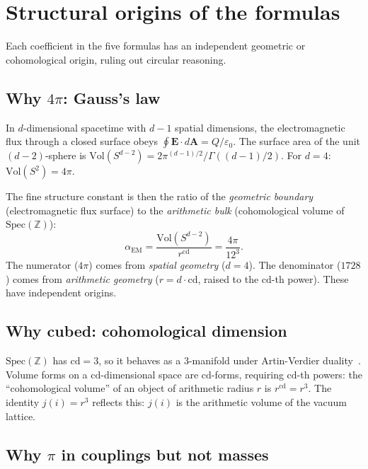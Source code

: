 \documentclass[aps,prl,twocolumn,superscriptaddress,nofootinbib]{revtex4-2}
\newcommand{\Spec}{\mathrm{Spec}}
\newcommand{\cd}{\mathrm{cd}}
\newcommand{\Z}{\mathbb{Z}}
\begin{document}
\section{Structural origins of the formulas}

Each coefficient in the five formulas has an independent geometric
or cohomological origin, ruling out circular reasoning.

\subsection{Why $4\pi$: Gauss's law}

In $d$-dimensional spacetime with $d-1$ spatial dimensions,
the electromagnetic flux through a closed surface obeys
$\oint \mathbf{E} \cdot d\mathbf{A} = Q/\varepsilon_0$.
The surface area of the unit $(d-2)$-sphere is
$\mathrm{Vol}(S^{d-2}) = 2\pi^{(d-1)/2}/\Gamma((d-1)/2)$.
For $d = 4$: $\mathrm{Vol}(S^2) = 4\pi$.

The fine structure constant is then the ratio of the
\emph{geometric boundary} (electromagnetic flux surface)
to the \emph{arithmetic bulk} (cohomological volume of $\Spec(\Z)$):
\begin{equation}
  \alpha_{\mathrm{EM}} = \frac{\mathrm{Vol}(S^{d-2})}{r^{\cd}}
  = \frac{4\pi}{12^3}.
\end{equation}
The numerator ($4\pi$) comes from \emph{spatial geometry} ($d = 4$).
The denominator ($1728$) comes from \emph{arithmetic geometry}
($r = d \cdot \cd$, raised to the $\cd$-th power).
These have independent origins.

\subsection{Why cubed: cohomological dimension}

$\Spec(\Z)$ has $\cd = 3$, so it behaves as a 3-manifold
under Artin-Verdier duality~\cite{ArtinVerdier}.
Volume forms on a $\cd$-dimensional space are $\cd$-forms,
requiring $\cd$-th powers: the ``cohomological volume'' of an
object of arithmetic radius $r$ is $r^{\cd} = r^3$.
The identity $j(i) = r^3$ reflects this: $j(i)$ is the
arithmetic volume of the vacuum lattice.

\subsection{Why $\pi$ in couplings but not masses}
\end{document}
